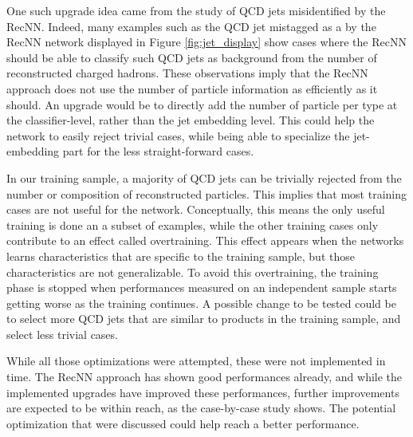 One such upgrade idea came from the study of QCD jets misidentified by the RecNN. Indeed, many examples such as the QCD jet mistagged as a \tauh by the RecNN network displayed in Figure \ref{fig:jet_display} show cases where the RecNN should be able to classify such QCD jets as background from the number of reconstructed charged hadrons. These observations imply that the RecNN approach does not use the number of particle information as efficiently as it should. An upgrade would be to directly add the number of particle per type at the classifier-level, rather than the jet embedding level. This could help the network to easily reject trivial cases, while being able to specialize the jet-embedding part for the less straight-forward cases.

In our training sample, a majority of QCD jets can be trivially rejected from the number or composition of reconstructed particles. This implies that most training cases are not useful for the network. Conceptually, this means the only useful training is done an a subset of examples, while the other training cases only contribute to an effect called overtraining. This effect appears when the networks learns characteristics that are specific to the training sample, but those characteristics are not generalizable. To avoid this overtraining, the training phase is stopped when performances measured on an independent sample starts getting worse as the training continues. A possible change to be tested could be to select more QCD jets that are similar to \tauh products in the training sample, and select less trivial cases.

While all those optimizations were attempted, these were not implemented in time. The RecNN approach has shown good performances already, and while the implemented upgrades have improved these performances, further improvements are expected to be within reach, as the case-by-case study shows. The potential optimization that were discussed could help reach a better performance.